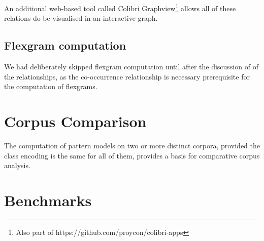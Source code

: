 An additional web-based tool called Colibri Graphview\footnote{Also part of
https://github.com/proycon/colibri-apps} allows all of these relations do be
visualised in an interactive graph.

\subsection{Flexgram computation}

We had deliberately skipped flexgram computation until after the discussion of
of the relationships, as the co-occurrence relationship is necessary
prerequisite for the computation of flexgrams.


\section{Corpus Comparison}

The computation of pattern models on two or more distinct corpora, provided the
class encoding is the same for all of them, provides a basis for comparative
corpus analysis.


\section{Benchmarks}















